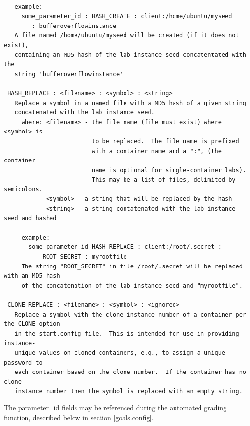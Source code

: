 \documentclass[12pt]{article}
\begin{document}
\begin{verbatim}
                   
   example:
     some_parameter_id : HASH_CREATE : client:/home/ubuntu/myseed 
        : bufferoverflowinstance
   A file named /home/ubuntu/myseed will be created (if it does not exist), 
   containing an MD5 hash of the lab instance seed concatentated with the 
   string 'bufferoverflowinstance'.
 
 HASH_REPLACE : <filename> : <symbol> : <string>
   Replace a symbol in a named file with a MD5 hash of a given string 
   concatenated with the lab instance seed.
     where: <filename> - the file name (file must exist) where <symbol> is 
                         to be replaced.  The file name is prefixed 
                         with a container name and a ":", (the container 
                         name is optional for single-container labs).  
                         This may be a list of files, delimited by semicolons. 
            <symbol> - a string that will be replaced by the hash
            <string> - a string contatenated with the lab instance seed and hashed

     example:
       some_parameter_id HASH_REPLACE : client:/root/.secret : 
           ROOT_SECRET : myrootfile
     The string "ROOT_SECRET" in file /root/.secret will be replaced with an MD5 hash
     of the concatenation of the lab instance seed and "myrootfile".

 CLONE_REPLACE : <filename> : <symbol> : <ignored>
   Replace a symbol with the clone instance number of a container per the CLONE option
   in the start.config file.  This is intended for use in providing instance-
   unique values on cloned containers, e.g., to assign a unique password to
   each container based on the clone number.  If the container has no clone
   instance number then the symbol is replaced with an empty string.
\end{verbatim}

The parameter\_id fields may be referenced during the automated grading function, described below
in section \ref{goals.config}. 
\end{document}
